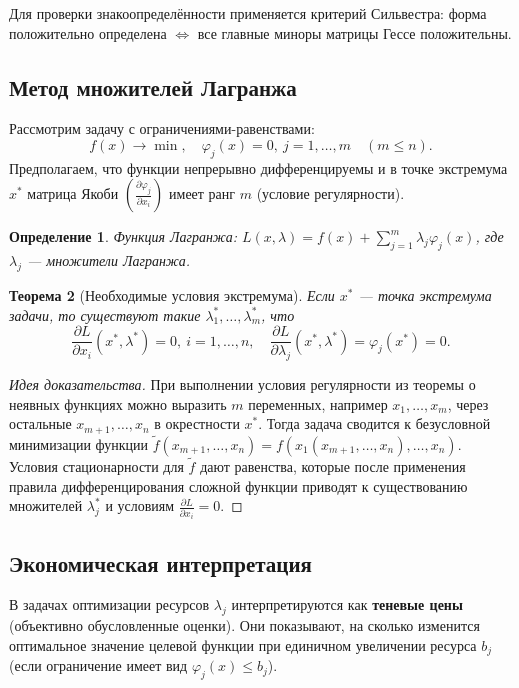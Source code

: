 \documentclass{article}
\theoremstyle{plain}
\newtheorem{theorem}{Теорема}[section]
\newtheorem{definition}[theorem]{Определение}
\begin{document}
Для проверки знакоопределённости применяется критерий Сильвестра: форма положительно определена $\iff$ все главные миноры матрицы Гессе положительны.

\subsection{Метод множителей Лагранжа}
Рассмотрим задачу с ограничениями-равенствами:
\[
f(x) \to \min,\quad \varphi_j(x)=0,\ j=1,\dots,m \quad (m \le n).
\]
Предполагаем, что функции непрерывно дифференцируемы и в точке экстремума $x^*$ матрица Якоби $\left(\frac{\partial \varphi_j}{\partial x_i}\right)$ имеет ранг $m$ (условие регулярности).

\begin{definition}
Функция Лагранжа: $L(x, \lambda) = f(x) + \sum_{j=1}^m \lambda_j \varphi_j(x)$, где $\lambda_j$ — множители Лагранжа.
\end{definition}

\begin{theorem}[Необходимые условия экстремума]
Если $x^*$ — точка экстремума задачи, то существуют такие $\lambda_1^*,\dots,\lambda_m^*$, что
\[
\frac{\partial L}{\partial x_i}(x^*,\lambda^*) = 0,\ i=1,\dots,n,\quad \frac{\partial L}{\partial \lambda_j}(x^*,\lambda^*) = \varphi_j(x^*) = 0.
\]
\end{theorem}
\begin{proof}[Идея доказательства]
При выполнении условия регулярности из теоремы о неявных функциях можно выразить $m$ переменных, например $x_1,\dots,x_m$, через остальные $x_{m+1},\dots,x_n$ в окрестности $x^*$. Тогда задача сводится к безусловной минимизации функции $\tilde{f}(x_{m+1},\dots,x_n) = f(x_1(x_{m+1},\dots,x_n),\dots,x_n)$. Условия стационарности для $\tilde{f}$ дают равенства, которые после применения правила дифференцирования сложной функции приводят к существованию множителей $\lambda_j^*$ и условиям $\frac{\partial L}{\partial x_i}=0$.
\end{proof}

\subsection{Экономическая интерпретация}
В задачах оптимизации ресурсов $\lambda_j$ интерпретируются как \textbf{теневые цены} (объективно обусловленные оценки). Они показывают, на сколько изменится оптимальное значение целевой функции при единичном увеличении ресурса $b_j$ (если ограничение имеет вид $\varphi_j(x) \le b_j$).
\end{document}
